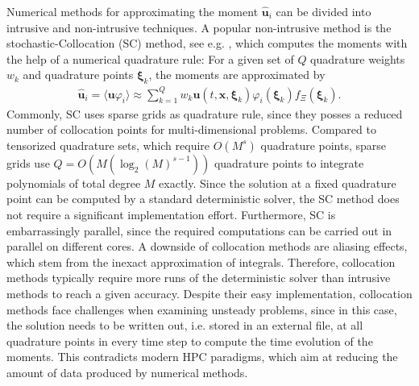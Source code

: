 Numerical methods for approximating the moment $\bm{\hat u}_i$ can be divided into intrusive and non-intrusive techniques. A popular non-intrusive method is the stochastic-Collocation (SC) method, see e.g. \cite{xiu2005high,babuvska2007stochastic,loeven2008probabilistic}, which computes the moments with the help of a numerical quadrature rule: For a given set of $Q$ quadrature weights $w_k$ and quadrature points $\bm{\xi}_k$, the moments are approximated by
\begin{align*}
\bm{\hat u}_i = \langle \bm{u}\varphi_i \rangle \approx \sum_{k = 1}^{Q}w_k \bm{u}({t,\bm{x},\bm{\xi}_k})\varphi_i(\bm{\xi}_k)f_{\Xi}(\bm{\xi}_k).
\end{align*} 
Commonly, SC uses sparse grids as quadrature rule, since they posses a reduced number of collocation points for multi-dimensional problems. Compared to tensorized quadrature sets, which require $O(M^s)$ quadrature points, sparse grids use $Q = O(M(\log_2(M)^{s-1}))$ quadrature points to integrate polynomials of total degree $M$ exactly. 
Since the solution at a fixed quadrature point can be computed by a standard deterministic solver, the SC method does not require a significant implementation effort. Furthermore, SC is embarrassingly parallel, since the required computations can be carried out in parallel on different cores. A downside of collocation methods are aliasing effects, which stem from the inexact approximation of integrals. Therefore, collocation methods typically require more runs of the deterministic solver than intrusive methods \cite{xiu2009fast,alekseev2011estimation} to reach a given accuracy. Despite their easy implementation, collocation methods face challenges when examining unsteady problems, since in this case, the solution needs to be written out, i.e. stored in an external file, at all quadrature points in every time step to compute the time evolution of the moments. This contradicts modern HPC paradigms, which aim at reducing the amount of data produced by numerical methods.

